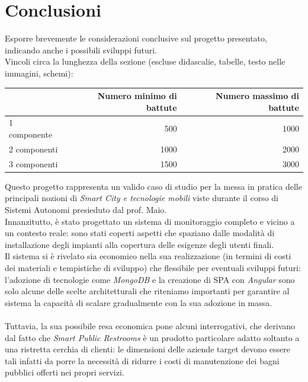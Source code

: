 \documentclass[12pt]{article}
\begin{document}

\section{Conclusioni}

Esporre brevemente le considerazioni conclusive sul progetto presentato, indicando anche i possibili sviluppi futuri.\\

Vincoli circa la lunghezza della sezione (escluse didascalie, tabelle, testo nelle immagini, schemi):

\vspace{1cm}
\begin{tabular}{l|rr}
 & Numero minimo di battute & Numero massimo di battute \\
 \hline
 1 componente & 500 & 1000 \\
 2 componenti & 1000 & 2000 \\
 3 componenti & 1500 & 3000 \\
 \hline
\end{tabular}
\newpage
Questo progetto rappresenta un valido caso di studio per la messa in pratica delle principali nozioni di \textit{Smart City e tecnologie mobili} viste durante il corso di Sistemi Autonomi presieduto dal prof. Maio.\\
Innanzitutto, è stato progettato un sistema di monitoraggio completo e vicino a un contesto reale: sono stati coperti aspetti che spaziano dalle modalità di installazione degli impianti alla copertura delle esigenze degli utenti finali.\\
Il sistema si è rivelato sia economico nella sua realizzazione (in termini di costi dei materiali e tempistiche di sviluppo) che flessibile per eventuali sviluppi futuri: l'adozione di tecnologie come \textit{MongoDB} e la creazione di SPA con \textit{Angular} sono solo alcune delle scelte architetturali che riteniamo importanti per garantire al sistema la capacità di scalare gradualmente con la sua adozione in massa.\\\\
Tuttavia, la sua possibile resa economica pone alcuni interrogativi, che derivano dal fatto che \textit{Smart Public Restrooms} è un prodotto particolare adatto soltanto a una ristretta cerchia di clienti: le dimensioni delle aziende target devono essere tali infatti da porre la necessità di ridurre i costi di manutenzione dei bagni pubblici offerti nei propri servizi.\\
\end{document}
